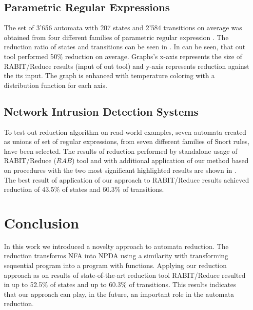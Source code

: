 \documentclass{ExcelAtFIT}
\begin{document}
	\subsection{Parametric Regular Expressions}
		The set of 3'656 automata with 207 states and 2'584 transitions on average was obtained from four different families of parametric regular expression \cite{Regex_param}. The reduction ratio of states and transitions can be seen in . In can be seen, that out tool performed 50\% reduction on average. Graphs's x-axis represents the size of RABIT/Reduce results (input of out tool) and y-axis represents reduction against the its input. The graph is enhanced with temperature coloring with a distribution function for each axis.

	\subsection{Network Intrusion Detection Systems}
		To test out reduction algorithm on read-world examples, seven automata created as unions of set of regular expressions, from seven different families of Snort rules, have been selected. The results of reduction performed by standalone usage of RABIT/Reduce ($RAB$) tool and with additional application of our method based on procedures with the two most significant highlighted results are shown in . The best result of application of our approach to RABIT/Reduce results achieved reduction of 43.5\% of states and 60.3\% of transitions.

\section{Conclusion}
	In this work we introduced a novelty approach to automata reduction. The reduction transforms NFA into NPDA using a similarity with transforming sequential program into a program with functions. Applying our reduction approach as on results of state-of-the-art reduction tool RABIT/Reduce resulted in up to 52.5\% of states and up to 60.3\% of transitions. This results indicates that our approach can play, in the future, an important role in the automata reduction.






\end{document}
